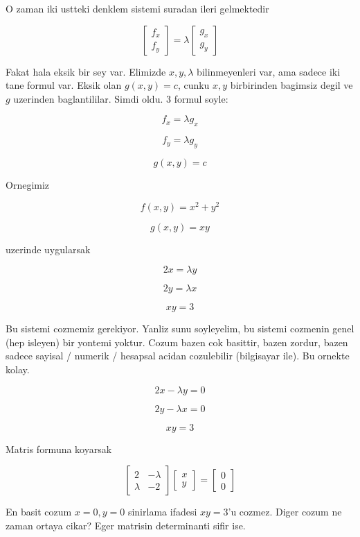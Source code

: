 \documentclass[12pt,fleqn]{article}\usepackage{../common}
\begin{document}
O zaman iki ustteki denklem sistemi suradan ileri gelmektedir

\[ 
\left[\begin{array}{r}
f_x \\
f_y
\end{array}\right]  = 
\lambda
\left[\begin{array}{r}
g_x \\
g_y
\end{array}\right]
 \]

Fakat hala eksik bir sey var. Elimizde $x,y,\lambda$ bilinmeyenleri var,
ama sadece iki tane formul var. Eksik olan $g(x,y) = c$, cunku $x,y$
birbirinden bagimsiz degil ve $g$ uzerinden baglantililar. Simdi oldu. 3
formul soyle:

\[ f_x = \lambda g_x \]

\[ f_y = \lambda g_y \]

\[ g(x,y) = c \]

Ornegimiz 

\[ f(x,y) = x^2 + y^2 \]

\[ g(x,y) = xy  \]

uzerinde uygularsak

\[ 2x = \lambda y \]

\[ 2y = \lambda x \]

\[ xy = 3 \]

Bu sistemi cozmemiz gerekiyor. Yanliz sunu soyleyelim, bu sistemi cozmenin
genel (hep isleyen) bir yontemi yoktur. Cozum bazen cok basittir, bazen
zordur, bazen sadece sayisal / numerik / hesapsal acidan cozulebilir
(bilgisayar ile). Bu ornekte kolay. 

\[ 2x - \lambda y = 0\]

\[ 2y - \lambda x = 0 \]

\[ xy = 3 \]

Matris formuna koyarsak

\[ 
\left[\begin{array}{rr}
2 & -\lambda \\
\lambda & -2
\end{array}\right]
\left[\begin{array}{r}
x \\ y
\end{array}\right]
=
\left[\begin{array}{r}
0 \\ 0
\end{array}\right]
 \]

En basit cozum $x=0,y=0$ sinirlama ifadesi $xy=3$'u cozmez. Diger cozum ne
zaman ortaya cikar? Eger matrisin determinanti sifir ise. 
\end{document}
